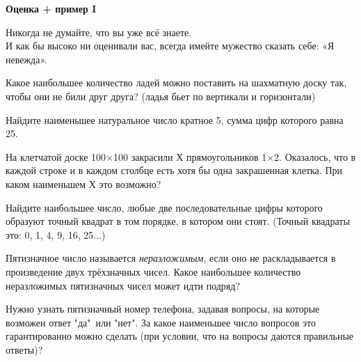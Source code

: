 \centerline{\bf \Huge Оценка + пример I}

\begin{flushright}
        \scriptsize{Никогда не думайте, что вы уже всё знаете. \\
                    И как бы высоко ни оценивали вас, всегда имейте мужество сказать себе: «Я невежда».}
\end{flushright}

Какое наибольшее количество ладей можно поставить на шахматную доску так, чтобы они не били друг друга? (ладья бьет по вертикали и горизонтали)

Найдите наименьшее натуральное число кратное 5, сумма цифр которого равна 25.

На клетчатой доске 100×100 закрасили Х прямоугольников 1×2. Оказалось, что в каждой строке и в каждом столбце есть хотя бы одна закрашенная клетка. При каком наименьшем Х это возможно?


Найдите наибольшее число, любые две последовательные цифры которого образуют точный квадрат в том порядке, в котором они стоят. (Точный квадраты это: 0, 1, 4, 9, 16, 25...)


Пятизначное число называется \textit{неразложимым}, если оно не раскладывается в произведение двух трёхзначных чисел. Какое наибольшее количество неразложимых пятизначных чисел может идти подряд?

Нужно узнать пятизначный номер телефона, задавая вопросы, на которые возможен ответ "да"\ или "нет". За какое наименьшее число вопросов это гарантированно можно сделать (при условии, что на вопросы даются правильные ответы)?